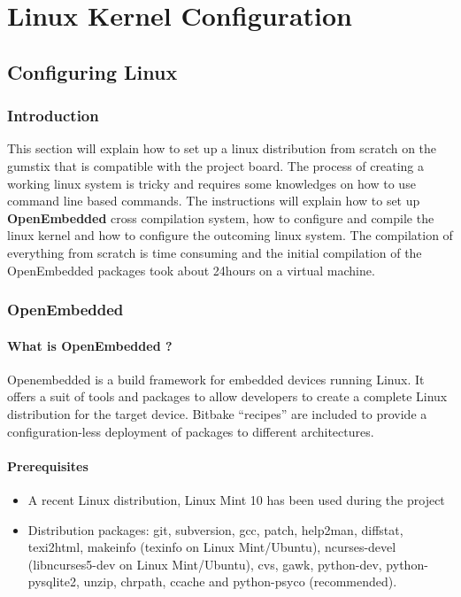 \documentclass[11pt]{report} %
\begin{document}
\chapter{Linux Kernel Configuration}
	\section{Configuring Linux}
	\subsection{Introduction}
		\indent This section will explain how to set up a linux distribution
		from scratch on the gumstix that is compatible with the project board.
		The process of creating a working linux system is tricky
		and requires some knowledges on how to use command line based commands.
		The instructions will explain how to set up {\bf OpenEmbedded} cross
		compilation system, how to configure and compile the linux kernel and
		how to configure the outcoming linux system. The compilation of
		everything from scratch is time consuming and the initial compilation
		of the OpenEmbedded packages took about 24hours on a virtual machine.

	\subsection{OpenEmbedded}
	\subsubsection{What is OpenEmbedded ?}
		Openembedded is a build framework for embedded devices running Linux.
		It offers a suit of tools and packages to allow developers to create a
		complete Linux distribution for the target device. Bitbake ``recipes''
		are included to provide a configuration-less deployment of packages to
		different architectures.

	\subsubsection{Prerequisites}
		\begin{itemize}	
			\item A recent Linux distribution, Linux Mint 10 has been used 
			during the project

			\item Distribution packages: git, subversion, gcc, patch, help2man,
			diffstat, texi2html, makeinfo (texinfo on Linux Mint/Ubuntu),
			ncurses-devel (libncurses5-dev on Linux Mint/Ubuntu), cvs, gawk,
			python-dev, python-pysqlite2, unzip, chrpath, ccache and 
			python-psyco (recommended).
		\end{itemize}
\end{document}
